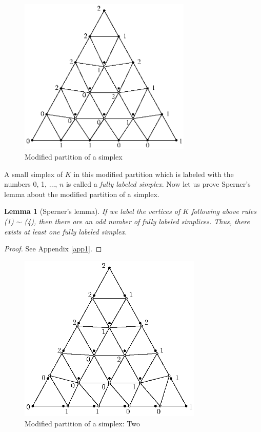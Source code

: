 \documentclass[reqno]{amsart}
\newtheorem{lem}{Lemma}
\begin{document}
\begin{figure}[ptb]
\begin{center}
\includegraphics[height=7.5cm]{br-non3.eps}
\end{center}
	\vspace*{-.3cm}
	\caption{Modified partition of a simplex}
	\label{tria12}
\end{figure}

A small simplex of $K$ in this modified partition which is labeled with the numbers 0, 1, $\dots$, $n$ is called a \emph{fully labeled simplex}. Now let us prove Sperner's lemma about the modified partition of a simplex.
\begin{lem}[Sperner's lemma]
If we label the vertices of $K$ following above rules (1) $\sim$ (4), then there are an odd number of fully labeled simplices. Thus, there exists at least one fully labeled simplex. \label{l2}
\end{lem}
\begin{proof}
See Appendix \ref{app1}.
\end{proof}

\begin{figure}[t]
\begin{center}
\includegraphics[height=8cm]{two.eps}
\end{center}
	\vspace*{-.3cm}
	\caption{Modified partition of a simplex: Two}
	\label{tria13}
\end{figure}
\end{document}
